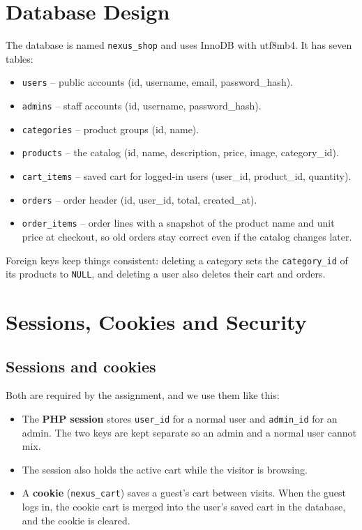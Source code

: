 \documentclass[11pt,a4paper]{article}
\begin{document}
\section{Database Design}

The database is named \texttt{nexus\_shop} and uses InnoDB with utf8mb4.
It has seven tables:

\begin{itemize}
    \item \texttt{users} -- public accounts
        (id, username, email, password\_hash).
    \item \texttt{admins} -- staff accounts
        (id, username, password\_hash).
    \item \texttt{categories} -- product groups (id, name).
    \item \texttt{products} -- the catalog
        (id, name, description, price, image, category\_id).
    \item \texttt{cart\_items} -- saved cart for logged-in users
        (user\_id, product\_id, quantity).
    \item \texttt{orders} -- order header
        (id, user\_id, total, created\_at).
    \item \texttt{order\_items} -- order lines with a snapshot of the
        product name and unit price at checkout, so old orders stay
        correct even if the catalog changes later.
\end{itemize}

Foreign keys keep things consistent: deleting a category sets the
\texttt{category\_id} of its products to \texttt{NULL}, and deleting a
user also deletes their cart and orders.

\section{Sessions, Cookies and Security}

\subsection{Sessions and cookies}
Both are required by the assignment, and we use them like this:
\begin{itemize}
    \item The \textbf{PHP session} stores \texttt{user\_id} for a normal
        user and \texttt{admin\_id} for an admin. The two keys are kept
        separate so an admin and a normal user cannot mix.
    \item The session also holds the active cart while the visitor is
        browsing.
    \item A \textbf{cookie} (\texttt{nexus\_cart}) saves a guest's cart
        between visits. When the guest logs in, the cookie cart is merged
        into the user's saved cart in the database, and the cookie is
        cleared.
\end{itemize}
\end{document}
